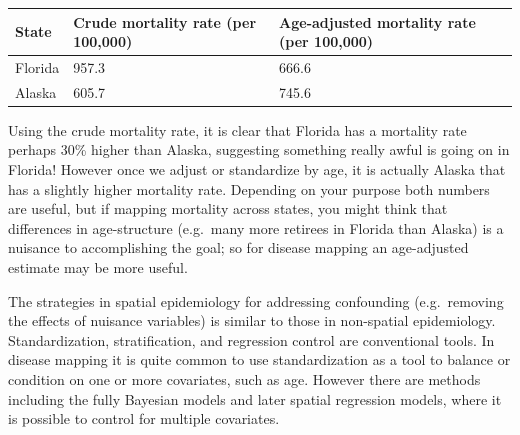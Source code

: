 \documentclass[
]{book}
\begin{document}
\begin{longtable}[]{@{}lll@{}}
\toprule
\begin{minipage}[b]{0.10\columnwidth}\raggedright
State\strut
\end{minipage} & \begin{minipage}[b]{0.41\columnwidth}\raggedright
Crude mortality rate (per 100,000)\strut
\end{minipage} & \begin{minipage}[b]{0.41\columnwidth}\raggedright
Age-adjusted mortality rate (per 100,000)\strut
\end{minipage}\tabularnewline
\midrule
\endhead
\begin{minipage}[t]{0.10\columnwidth}\raggedright
Florida\strut
\end{minipage} & \begin{minipage}[t]{0.41\columnwidth}\raggedright
957.3\strut
\end{minipage} & \begin{minipage}[t]{0.41\columnwidth}\raggedright
666.6\strut
\end{minipage}\tabularnewline
\begin{minipage}[t]{0.10\columnwidth}\raggedright
Alaska\strut
\end{minipage} & \begin{minipage}[t]{0.41\columnwidth}\raggedright
605.7\strut
\end{minipage} & \begin{minipage}[t]{0.41\columnwidth}\raggedright
745.6\strut
\end{minipage}\tabularnewline
\bottomrule
\end{longtable}

Using the crude mortality rate, it is clear that Florida has a mortality rate perhaps 30\% higher than Alaska, suggesting something really awful is going on in Florida! However once we adjust or standardize by age, it is actually Alaska that has a slightly higher mortality rate. Depending on your purpose both numbers are useful, but if mapping mortality across states, you might think that differences in age-structure (e.g.~many more retirees in Florida than Alaska) is a nuisance to accomplishing the goal; so for disease mapping an age-adjusted estimate may be more useful.

The strategies in spatial epidemiology for addressing confounding (e.g.~removing the effects of nuisance variables) is similar to those in non-spatial epidemiology. Standardization, stratification, and regression control are conventional tools. In disease mapping it is quite common to use standardization as a tool to balance or condition on one or more covariates, such as age. However there are methods including the fully Bayesian models and later spatial regression models, where it is possible to control for multiple covariates.
\end{document}
